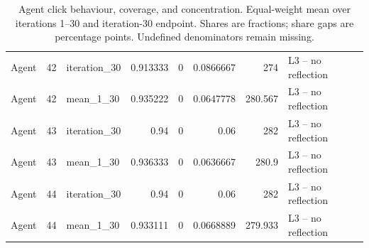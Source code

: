 \begin{table}[htbp!]
\begin{tabular}{lrlrrrrl}
Agent & 42 & iteration\_30 & 0.913333 & 0 & 0.0866667 & 274 & L3 -- no reflection \\
Agent & 42 & mean\_1\_30 & 0.935222 & 0 & 0.0647778 & 280.567 & L3 -- no reflection \\
Agent & 43 & iteration\_30 & 0.94 & 0 & 0.06 & 282 & L3 -- no reflection \\
Agent & 43 & mean\_1\_30 & 0.936333 & 0 & 0.0636667 & 280.9 & L3 -- no reflection \\
Agent & 44 & iteration\_30 & 0.94 & 0 & 0.06 & 282 & L3 -- no reflection \\
Agent & 44 & mean\_1\_30 & 0.933111 & 0 & 0.0668889 & 279.933 & L3 -- no reflection \\
\hline
\end{tabular}
\caption{Agent click behaviour, coverage, and concentration. Equal-weight mean over iterations 1--30 and iteration-30 endpoint. Shares are fractions; share gaps are percentage points. Undefined denominators remain missing.}
\label{chap:results:tab:rq3_agents_click_behaviour}
\end{table}

